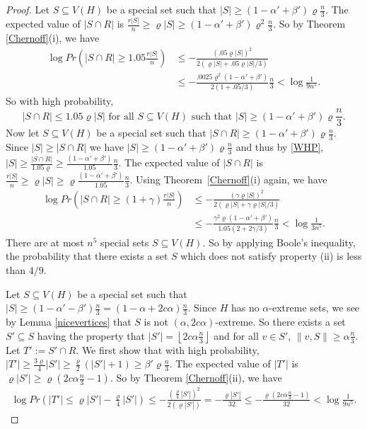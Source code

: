 \documentclass[oneside,12pt]{memoir}
\newcommand{\floor}[1]{\left\lfloor#1\right\rfloor}
\begin{document}
\begin{proof}
Let $S\subseteq V(H)$ be a special set such that $|S|\geq(1-\alpha'+\beta')\varrho\frac{ n}{3}$. %
The expected value of $|S\cap R|$ is $\frac{r|S|}{n}\geq\varrho|S|\geq (1-\alpha'+\beta')\varrho^2\frac{ n}{3}$.
So by Theorem \ref{Chernoff}(i), we have
\begin{align*}
\log Pr(|S\cap R|\geq1.05\frac{r|S|}{n})&\leq-\frac{(.05\varrho|S|)^{2}}{2(\varrho|S|+.05\varrho|S|/3)}\\
&\leq-\frac{.0025\varrho^{2}(1-\alpha'+\beta')}{2(1+.05/3)}\frac{n}{3}<\log\frac{1}{9n^{5}}.\end{align*}
So with high probability, \begin{equation}\label{WHP}|S\cap R|\leq 1.05\varrho |S|  \text{ for all } S\subseteq V(H) \text{ such that } |S|\geq(1-\alpha'+\beta')\varrho\frac{ n}{3} .\end{equation}  Now let $S\subseteq V(H)$ be a special set such that $|S\cap R|\geq(1-\alpha'+\beta')\varrho\frac{ n}{3}$.  Since $|S|\geq |S\cap R|$ we have $|S|\geq (1-\alpha'+\beta')\varrho\frac{ n}{3}$ and thus by \eqref{WHP}, $|S|\geq \frac{|S\cap R|}{1.05\varrho}\geq \frac{(1-\alpha'+\beta')}{1.05}\frac{n}{3}$. The expected value of $|S\cap R|$ is $\frac{r|S|}{n}\geq\varrho|S|\geq \varrho \frac{(1-\alpha'+\beta')}{1.05}\frac{n}{3}$.  Using Theorem~\ref{Chernoff}(i) again, we have
\begin{align*}
\log Pr(|S\cap R|\geq(1+\gamma)\frac{r|S|}{n})&\leq-\frac{(\gamma\varrho|S|)^2}{2(\varrho|S|+\gamma\varrho|S|/3)}\\
&\leq-\frac{\gamma^{2}\varrho(1-\alpha'+\beta')}{1.05(2+2\gamma/3)}\frac{n}{3}<\log\frac{1}{3n^{5}}.\end{align*}
There are at most $n^5$ special sets $S\subseteq V(H)$. So by applying Boole's inequality, the probability that there exists a set $S$ which does not satisfy property (ii) is less than $4/9$.

Let $S\subseteq V(H)$ be a special set such that $|S|\geq(1-\alpha'-\beta')\frac{n}{3}=(1-\alpha+2c\alpha)\frac{n}{3}$.
Since $H$ has no $\alpha$-extreme sets, we see by Lemma \ref{nicevertices} that $S$ is not $(\alpha, 2c\alpha)$-extreme. So there exists a set $S'\subseteq S$ having
the property that $|S'|=\floor{2c\alpha\frac{n}{3}}$ and for all $v\in S'$,
$\|v,S\|\geq\alpha\frac{ n}{3}$. Let $T':=S'\cap R$.
We first show that with high probability, $|T'|\geq\frac{3\varrho}{4}|S'|\geq \frac{\varrho}{2}(|S'|+1)\geq \beta'\varrho\frac{n}{3}$.
The expected value of $|T'|$ is $\varrho|S'|\geq\varrho(2c\alpha\frac{n}{3}-1)$.  So by Theorem \ref{Chernoff}(ii), we have \begin{align*}
\log Pr(|T'|\leq\varrho|S'|-\frac{\varrho}{4}|S'|)\leq-\frac{(\frac{\varrho}{4}|S'|)^{2}}{2(\varrho|S'|)}=-\frac{\varrho|S'|}{32} \leq-\frac{\varrho(2c\alpha\frac{n}{3}-1)}{32}<\log\frac{1}{9n^{5}}.\end{align*}


\end{proof}
\end{document}
